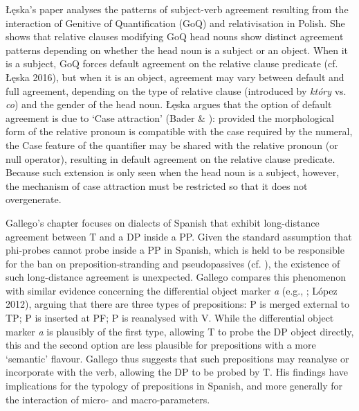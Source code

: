 \documentclass[output=paper]{langsci/langscibook}
\begin{document}
Łęska’s paper analyses the patterns of subject-verb agreement resulting from the interaction of Genitive of Quantification (GoQ) and relativisation in Polish. She shows that relative clauses modifying GoQ head nouns show distinct agreement patterns depending on whether the head noun is a subject or an object. When it is a subject, GoQ forces default agreement on the relative clause predicate (cf. Łęska 2016), but when it is an object, agreement may vary between default and full agreement, depending on the type of relative clause (introduced by \textit{który} vs. \textit{co}) and the gender of the head noun. Łęska argues that the option of default agreement is due to ‘Case attraction’ (Bader \& \citealt{Bayer2006}): provided the morphological form of the relative pronoun is compatible with the case required by the numeral, the Case feature of the quantifier may be shared with the relative pronoun (or null operator), resulting in default agreement on the relative clause predicate. Because such extension is only seen when the head noun is a subject, however, the mechanism of case attraction must be restricted so that it does not overgenerate.

Gallego’s chapter focuses on dialects of Spanish that exhibit long-distance agreement between T and a DP inside a PP. Given the standard assumption that phi-probes cannot probe inside a PP in Spanish, which is held to be responsible for the ban on preposition-stranding and pseudopassives (cf. \citealt{Law2006}), the existence of such long-distance agreement is unexpected. Gallego compares this phenomenon with similar evidence concerning the differential object marker \textit{a} (e.g., \citealt{Torrego1998}; López 2012), arguing that there are three types of prepositions: P is merged external to TP; P is inserted at PF; P is reanalysed with V. While the differential object marker \textit{a} is plausibly of the first type, allowing T to probe the DP object directly, this and the second option are less plausible for prepositions with a more ‘semantic’ flavour. Gallego thus suggests that such prepositions may reanalyse or incorporate with the verb, allowing the DP to be probed by T. His findings have implications for the typology of prepositions in Spanish, and more generally for the interaction of micro- and macro-parameters.
\end{document}
